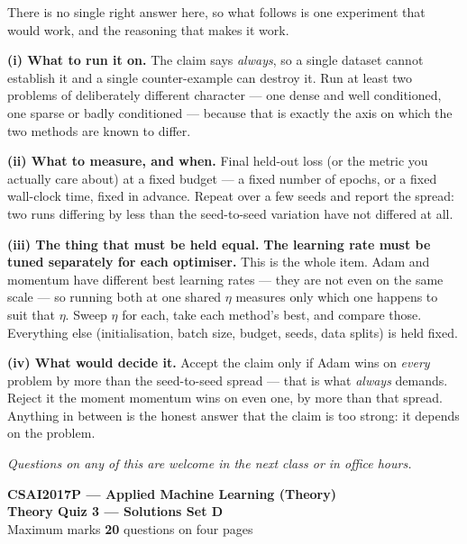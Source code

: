 \documentclass[10pt,a4paper]{article}
\newcommand{\SetLetter}{}
\begin{document}
There is no single right answer here, so what follows is one experiment that would work, and the reasoning that makes it work.\par\vspace{1mm}\textbf{(i) What to run it on.} The claim says \emph{always}, so a single dataset cannot establish it and a single counter-example can destroy it. Run at least two problems of deliberately different character --- one dense and well conditioned, one sparse or badly conditioned --- because that is exactly the axis on which the two methods are known to differ.\par\vspace{1mm}\textbf{(ii) What to measure, and when.} Final held-out loss (or the metric you actually care about) at a fixed budget --- a fixed number of epochs, or a fixed wall-clock time, fixed in advance. Repeat over a few seeds and report the spread: two runs differing by less than the seed-to-seed variation have not differed at all.\par\vspace{1mm}\textbf{(iii) The thing that must be held equal.} \textbf{The learning rate must be tuned separately for each optimiser.} This is the whole item. Adam and momentum have different best learning rates --- they are not even on the same scale --- so running both at one shared $\eta$ measures only which one happens to suit that $\eta$. Sweep $\eta$ for each, take each method's best, and compare those. Everything else (initialisation, batch size, budget, seeds, data splits) is held fixed.\par\vspace{1mm}\textbf{(iv) What would decide it.} Accept the claim only if Adam wins on \emph{every} problem by more than the seed-to-seed spread --- that is what \emph{always} demands. Reject it the moment momentum wins on even one, by more than that spread. Anything in between is the honest answer that the claim is too strong: it depends on the problem.

\vfill

{\footnotesize\itshape Questions on any of this are welcome in the next class or in office hours.}

\newpage


\renewcommand{\SetLetter}{D}\setcounter{page}{1}

\begin{center}
{\large\bfseries CSAI2017P --- Applied Machine Learning (Theory)}\\[2pt]
{\large\bfseries Theory Quiz 3 --- Solutions \quad\textbullet\quad Set D}\\[3pt]
{\small Maximum marks \textbf{20} \quad\textbullet{} questions on four pages}
\end{center}
\vspace{2pt}
\end{document}
